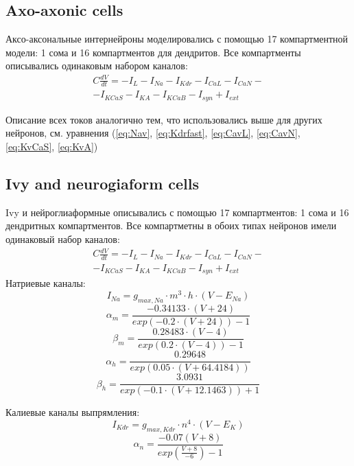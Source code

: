 \documentclass[a4paper,12pt]{article}
\begin{document}
\subsection{Axo-axonic cells}
Аксо-аксональные интернейроны моделировались с помощью 17 компартментной модели: 1 сома и 16 компартментов для дендритов. Все компартменты описывались одинаковым набором каналов:
\begin{eqnarray}
C\frac{dV}{dt}=-I_L-I_{Na}-I_{Kdr}-I_{CaL}-I_{CaN}- \nonumber \\ 
-I_{KCaS}-I_{KA}-I_{KCaB}-I_{syn} + I_{ext}
\end{eqnarray}

Описание всех токов аналогично тем, что использовались выше для других нейронов, см. уравнения (\ref{eq:Nav}, \ref{eq:Kdrfast}, \ref{eq:CavL}, \ref{eq:CavN}, \ref{eq:KvCaS}, \ref{eq:KvA})

\subsection{Ivy and neurogiaform cells}
Ivy и нейроглиаформные описывались с помощью 17 компартментов: 1 сома и 16 дендритных компартментов. Все компартметны в обоих типах нейронов имели одинаковый набор каналов:
\begin{eqnarray}
C\frac{dV}{dt}=-I_L-I_{Na}-I_{Kdr} - I_{CaL}-I_{CaN}- \nonumber \\
-I_{KCaS} -I_{KA}-I_{KCaB}-I_{syn} + I_{ext}
\end{eqnarray}
Натриевые каналы:
\begin{equation}
\label{eq:Navngf}
I_{Na} = g_{max, Na} \cdot m^3 \cdot h \cdot (V - E_{Na})
\end{equation}
\begin{equation}
\alpha_m = \frac{-0.34133 \cdot (V + 24)}{exp(-0.2\cdot(V+24)) - 1}
\end{equation}
\begin{equation}
\beta_m = \frac{0.28483 \cdot (V -4)}{exp(0.2\cdot(V-4)) - 1}
\end{equation}
\begin{equation}
\alpha_h = \frac{0.29648}{exp(0.05\cdot(V+64.4184))}
\end{equation}
\begin{equation}
\beta_h = \frac{3.0931}{exp(-0.1\cdot(V+12.1463)) + 1}
\end{equation}

Калиевые каналы выпрямления:
\begin{equation}
\label{eq:Kdrfastngf}
I_{Kdr} = g_{max, Kdr} \cdot n^4 \cdot (V - E_K)
\end{equation}
\begin{equation}
\alpha_n = \frac{-0.07(V + 8)}{exp(\frac{V + 8}{-6}) - 1}
\end{equation}
\end{document}
